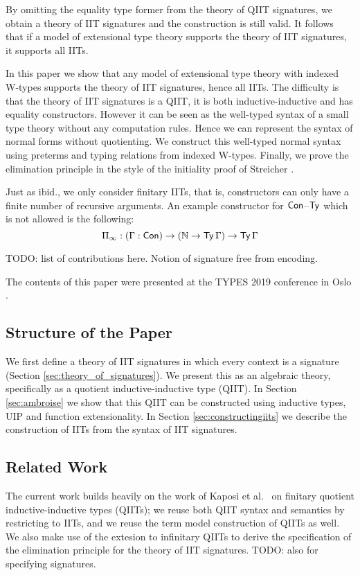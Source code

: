 \documentclass[a4paper,UKenglish,cleveref, autoref]{lipics-v2019}
\begin{document}
By omitting the equality type former from the theory of QIIT
signatures, we obtain a theory of IIT signatures and the construction
is still valid. It follows that if a model of extensional type theory
supports the theory of IIT signatures, it supports all IITs.

In this paper we show that any model of extensional type theory with
indexed W-types supports the theory of IIT signatures, hence all
IITs. The difficulty is that the theory of IIT signatures is a QIIT,
it is both inductive-inductive and has equality constructors. However
it can be seen as the well-typed syntax of a small type theory without
any computation rules. Hence we can represent the syntax of normal
forms without quotienting. We construct this well-typed normal syntax
using preterms and typing relations from indexed W-types. Finally, we
prove the elimination principle in the style of the initiality proof
of Streicher \cite{streichersemantics}.

Just as ibid., we only consider finitary IITs, that is, constructors
can only have a finite number of recursive arguments. An example
constructor for $\mathsf{Con}$--$\mathsf{Ty}$ which is not allowed is the following:
\[
  \Pi_\infty : (\Gamma : \mathsf{Con}) \rightarrow (\mathbb{N} \rightarrow \mathsf{Ty}\,\Gamma) \rightarrow \mathsf{Ty}\,\Gamma
\]

TODO: list of contributions here. Notion of signature free from encoding.

The contents of this paper were presented at the TYPES 2019 conference
in Oslo \cite{types}.

\subsection{Structure of the Paper}

We first define a theory of IIT signatures in which every context is a signature
(Section \ref{sec:theory_of_signatures}). We present this as an algebraic
\cite{ttintt} theory, specifically as a quotient inductive-inductive type
(QIIT). In Section \ref{sec:ambroise} we show that this QIIT can be constructed
using inductive types, UIP and function extensionality. In Section
\ref{sec:constructingiits} we describe the construction of IITs from the syntax
of IIT signatures.

\subsection{Related Work}

The current work builds heavily on the work of Kaposi et al.\
\cite{Kaposi:2019:CQI:3302515.3290315} on finitary quotient
inductive-inductive types (QIITs); we reuse both QIIT syntax and
semantics by restricting to IITs, and we reuse the term model
construction of QIITs as well. We also make use of the extesion to
infinitary QIITs \cite{large_inf_qiit} to derive the specification of
the elimination principle for the theory of IIT signatures. TODO: also
for specifying signatures.
\end{document}

